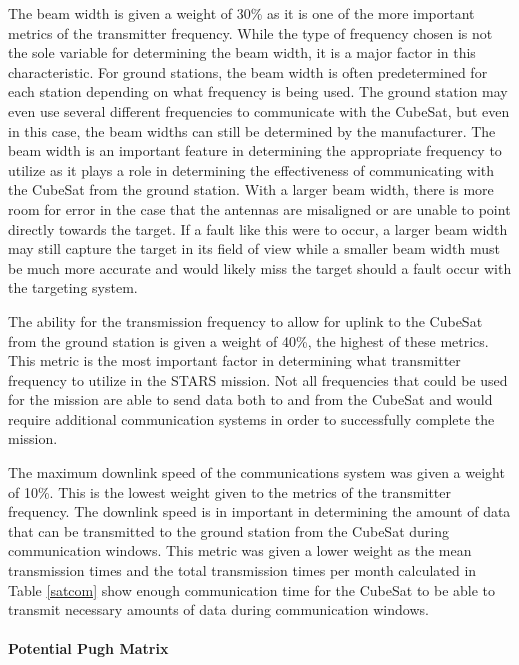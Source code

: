 The beam width is given a weight of 30\% as it is one of the more important metrics of the transmitter frequency. While the type of frequency chosen is not the sole variable for determining the beam width, it is a major factor in this characteristic. For ground stations, the beam width is often predetermined for each station depending on what frequency is being used. The ground station may even use several different frequencies to communicate with the CubeSat, but even in this case, the beam widths can still be determined by the manufacturer. The beam width is an important feature in determining the appropriate frequency to utilize as it plays a role in determining the effectiveness of communicating with the CubeSat from the ground station. With a larger beam width, there is more room for error in the case that the antennas are misaligned or are unable to point directly towards the target. If a fault like this were to occur, a larger beam width may still capture the target in its field of view while a smaller beam width must be much more accurate and would likely miss the target should a fault occur with the targeting system. 

The ability for the transmission frequency to allow for uplink to the CubeSat from the ground station is given a weight of 40\%, the highest of these metrics. This metric is the most important factor in determining what transmitter frequency to utilize in the STARS mission. Not all frequencies that could be used for the mission are able to send data both to and from the CubeSat and would require additional communication systems in order to successfully complete the mission. 

The maximum downlink speed of the communications system was given a weight of 10\%. This is the lowest weight given to the metrics of the transmitter frequency. The downlink speed is in important in determining the amount of data that can be transmitted to the ground station from the CubeSat during communication windows. This metric was given a lower weight as the mean transmission times and the total transmission times per month calculated in Table \ref{satcom} show enough communication time for the CubeSat to be able to transmit necessary amounts of data during communication windows. 

\paragraph{Potential Pugh Matrix}



